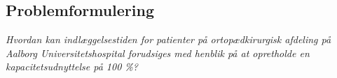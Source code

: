 \subsection{Problemformulering}
\textit{Hvordan kan indlæggelsestiden for patienter på ortopædkirurgisk afdeling på Aalborg Universitetshospital forudsiges med henblik på at opretholde en kapacitetsudnyttelse på 100 \%?}